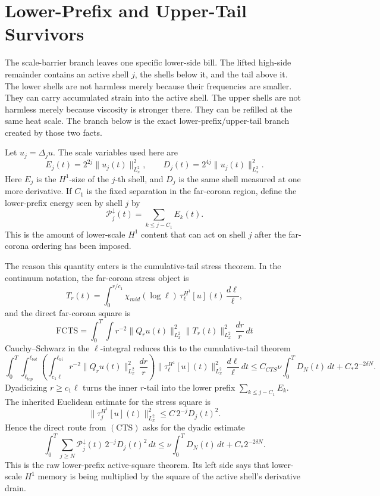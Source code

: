 \section{Lower-Prefix and Upper-Tail Survivors}
\label{sec:lower-prefix-upper-tail-branch}

The scale-barrier branch leaves one specific lower-side bill.  The lifted
high-side remainder contains an active shell \(j\), the shells below it, and
the tail above it.  The lower shells are not harmless merely because their
frequencies are smaller.  They can carry accumulated strain into the active
shell.  The upper shells are not harmless merely because viscosity is
stronger there.  They can be refilled at the same heat scale.  The branch
below is the exact lower-prefix/upper-tail branch created by those two facts.

Let \(u_j=\Delta_j u\).  The scale variables used here are
\[
  E_j(t)=2^{2j}\|u_j(t)\|_{L^2_x}^2,
  \qquad
  D_j(t)=2^{4j}\|u_j(t)\|_{L^2_x}^2.
\]
Here \(E_j\) is the \(H^1\)-size of the \(j\)-th shell, and \(D_j\) is the
same shell measured at one more derivative.  If \(C_1\) is the fixed
separation in the far-corona region, define the lower-prefix energy seen by
shell \(j\) by
\[
  \mathcal P_j^\downarrow(t)
  =
  \sum_{k\le j-C_1}E_k(t).
\]
This is the amount of lower-scale \(H^1\) content that can act on shell
\(j\) after the far-corona ordering has been imposed.

The reason this quantity enters is the cumulative-tail stress theorem.  In
the continuum notation, the far-corona stress object is
\[
  T_r(t)
  =
  \int_0^{r/c_1}
  \chi_{mid}(\log\ell)\,
  \tau_\ell^{H^1}[u](t)\,\frac{d\ell}{\ell},
\]
and the direct far-corona square is
\[
  \mathrm{FCTS}
  =
  \int_0^T\int
  r^{-2}\|Q_r u(t)\|_{L^2_x}^2
  \|T_r(t)\|_{L^2_x}^2\,\frac{dr}{r}\,dt
\]
Cauchy--Schwarz in the \(\ell\)-integral reduces this to the cumulative-tail
theorem
\[
  \int_0^T\int_{\ell_{top}}^{\ell_{bot}}
  \left(
  \int_{c_1\ell}^{\ell_{hi}}
  r^{-2}\|Q_r u(t)\|_{L^2_x}^2\,\frac{dr}{r}
  \right)
  \|\tau_\ell^{H^1}[u](t)\|_{L^2_x}^2\,\frac{d\ell}{\ell}\,dt
  \le
  C_{CTS}\nu\int_0^T D_N(t)\,dt+C_*2^{-2\delta N}.
  \tag{CTS}
\]
Dyadicizing \(r\ge c_1\ell\) turns the inner \(r\)-tail into the lower
prefix \(\sum_{k\le j-C_1}E_k\).  The inherited Euclidean estimate for the
stress square is
\[
  \|\tau_j^{H^1}[u](t)\|_{L^2_x}^2
  \le
  C\,2^{-j}D_j(t)^2.
\]
Hence the direct route from \((\mathrm{CTS})\) asks for the dyadic estimate
\[
  \int_0^T
  \sum_{j\ge N}
  \mathcal P_j^\downarrow(t)\,
  2^{-j}D_j(t)^2\,dt
  \le
  \nu\int_0^T D_N(t)\,dt+C_*2^{-2\delta N}.
  \tag{LPAS}
\]
This is the raw lower-prefix active-square theorem.  Its left side says that
lower-scale \(H^1\) memory is being multiplied by the square of the active
shell's derivative drain.

